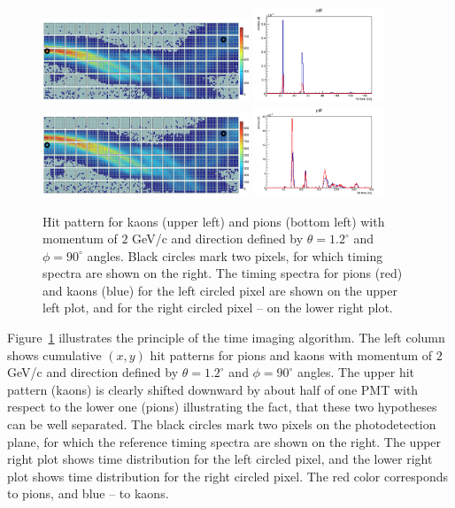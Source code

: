 \begin{figure}[!h]
\centering
\includegraphics[width=0.55\textwidth]{pics/kaonsTI.png} \hspace{0.05\textwidth} \includegraphics[width=0.35\textwidth]{pics/LeftPix.png} \\
\includegraphics[width=0.55\textwidth]{pics/pionsTI.png} \hspace{0.05\textwidth} \includegraphics[width=0.35\textwidth]{pics/rightPix.png} 
\caption{\label{pic:hitpatKpi}
Hit pattern for kaons (upper left) and pions (bottom left) with momentum of $2$ GeV/c and direction defined by $\theta = 1.2^{\circ}$ and $\phi = 90^{\circ}$ angles. Black circles mark two pixels, for which timing spectra are shown on the right. The timing spectra for pions (red) and kaons (blue) for the left circled pixel are shown on the upper left plot, and for the right circled pixel -- on the lower right plot.
}
\end{figure}

Figure~\ref{pic:hitpatKpi} illustrates the principle of the time imaging  algorithm. The left column shows cumulative $(x, y)$ hit patterns for pions and kaons with momentum of $2$ GeV/c and direction defined by $\theta = 1.2^{\circ}$ and $\phi = 90^{\circ}$ angles. The upper hit pattern (kaons) is clearly shifted downward by about half of one PMT with respect to the lower one (pions) illustrating the fact, that these two hypotheses can be well separated. The black circles mark two pixels on the photodetection plane, for which the reference timing spectra are shown on the right. The upper right plot shows time distribution for the left circled pixel, and the lower right plot shows time distribution for the right circled pixel. The red color corresponds to pions, and blue -- to kaons.
 
